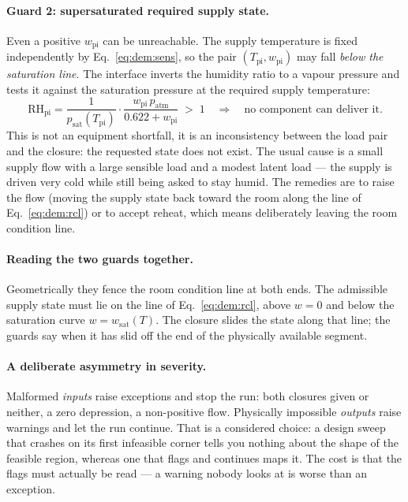 \documentclass[11pt]{article}
\newcommand{\patm}{\ensuremath{p_{\mathrm{atm}}}}
\newcommand{\psat}{\ensuremath{p_{\mathrm{sat}}}}
\newcommand{\RH}{\ensuremath{\mathrm{RH}}}
\begin{document}
\paragraph{Guard 2: supersaturated required supply state.} Even a positive
$w_{\mathrm{pi}}$ can be unreachable. The supply temperature is fixed
independently by Eq.~\eqref{eq:dem:sens}, so the pair
$(T_{\mathrm{pi}},w_{\mathrm{pi}})$ may fall \emph{below the saturation line}.
The interface inverts the humidity ratio to a vapour pressure and tests it
against the saturation pressure at the required supply temperature:
\begin{equation}
\RH_{\mathrm{pi}}
=\frac{1}{\psat(T_{\mathrm{pi}})}\cdot
\frac{w_{\mathrm{pi}}\,\patm}{0.622+w_{\mathrm{pi}}}\;>\;1
\quad\Longrightarrow\quad\text{no component can deliver it.}
\label{eq:dem:guard2}
\end{equation}
This is not an equipment shortfall, it is an inconsistency between the load pair
and the closure: the requested state does not exist. The usual cause is a small
supply flow with a large sensible load and a modest latent load --- the supply is
driven very cold while still being asked to stay humid. The remedies are to raise
the flow (moving the supply state back toward the room along the line of
Eq.~\eqref{eq:dem:rcl}) or to accept reheat, which means deliberately leaving the
room condition line.

\paragraph{Reading the two guards together.} Geometrically they fence the room
condition line at both ends. The admissible supply state must lie on the line of
Eq.~\eqref{eq:dem:rcl}, above $w=0$ and below the saturation curve
$w=w_{\mathrm{sat}}(T)$. The closure slides the state along that line; the guards
say when it has slid off the end of the physically available segment.

\paragraph{A deliberate asymmetry in severity.} Malformed \emph{inputs} raise
exceptions and stop the run: both closures given or neither, a zero depression, a
non-positive flow. Physically impossible \emph{outputs} raise warnings and let
the run continue. That is a considered choice: a design sweep that crashes on its
first infeasible corner tells you nothing about the shape of the feasible region,
whereas one that flags and continues maps it. The cost is that the flags must
actually be read --- a warning nobody looks at is worse than an exception.
\end{document}
